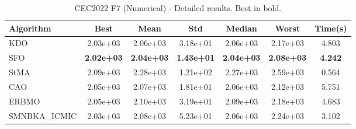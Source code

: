 \begin{table}[H]
\centering\small
\caption{CEC2022 F7 (Numerical) - Detailed results. Best in bold.}
\label{tab:cec2022_F7}
\begin{tabular}{lcccccc}
\toprule
\textbf{Algorithm} & \textbf{Best} & \textbf{Mean} & \textbf{Std} & \textbf{Median} & \textbf{Worst} & \textbf{Time(s)} \\
\midrule
KDO & 2.03e+03 & 2.06e+03 & 3.18e+01 & 2.06e+03 & 2.17e+03 & 4.803 \\
SFO & \textbf{2.02e+03} & \textbf{2.04e+03} & \textbf{1.43e+01} & \textbf{2.04e+03} & \textbf{2.08e+03} & \textbf{4.242} \\
StMA & 2.09e+03 & 2.28e+03 & 1.21e+02 & 2.27e+03 & 2.59e+03 & 0.564 \\
CAO & 2.05e+03 & 2.07e+03 & 1.81e+01 & 2.06e+03 & 2.12e+03 & 5.751 \\
ERBMO & 2.05e+03 & 2.10e+03 & 3.19e+01 & 2.09e+03 & 2.18e+03 & 4.683 \\
SMNBKA_ICMIC & 2.03e+03 & 2.08e+03 & 5.23e+01 & 2.06e+03 & 2.24e+03 & 3.102 \\
\bottomrule
\end{tabular}
\end{table}
